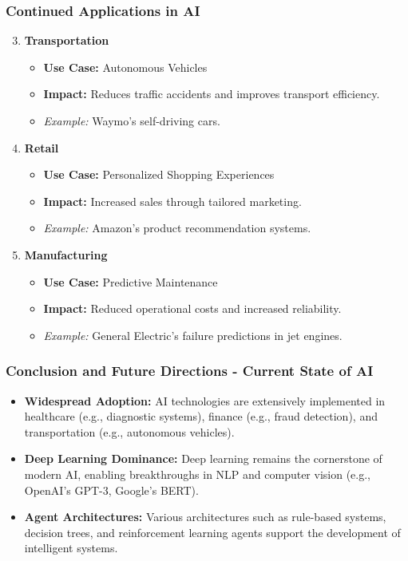 \documentclass[aspectratio=169]{beamer}
\begin{document}
\begin{frame}[fragile]
    \frametitle{Continued Applications in AI}
    \begin{enumerate}
        \setcounter{enumi}{2} %
        \item \textbf{Transportation}
            \begin{itemize}
                \item \textbf{Use Case:} Autonomous Vehicles
                \item \textbf{Impact:} Reduces traffic accidents and improves transport efficiency.
                \item \textit{Example:} Waymo's self-driving cars.
            \end{itemize}
        
        \item \textbf{Retail}
            \begin{itemize}
                \item \textbf{Use Case:} Personalized Shopping Experiences
                \item \textbf{Impact:} Increased sales through tailored marketing.
                \item \textit{Example:} Amazon's product recommendation systems.
            \end{itemize}

        \item \textbf{Manufacturing}
            \begin{itemize}
                \item \textbf{Use Case:} Predictive Maintenance
                \item \textbf{Impact:} Reduced operational costs and increased reliability.
                \item \textit{Example:} General Electric's failure predictions in jet engines.
            \end{itemize}
    \end{enumerate}
\end{frame}

\begin{frame}[fragile]
    \frametitle{Conclusion and Future Directions - Current State of AI}
    \begin{itemize}
        \item \textbf{Widespread Adoption:} AI technologies are extensively implemented in healthcare (e.g., diagnostic systems), finance (e.g., fraud detection), and transportation (e.g., autonomous vehicles).
        \item \textbf{Deep Learning Dominance:} Deep learning remains the cornerstone of modern AI, enabling breakthroughs in NLP and computer vision (e.g., OpenAI's GPT-3, Google's BERT).
        \item \textbf{Agent Architectures:} Various architectures such as rule-based systems, decision trees, and reinforcement learning agents support the development of intelligent systems.
    \end{itemize}
\end{frame}
\end{document}
